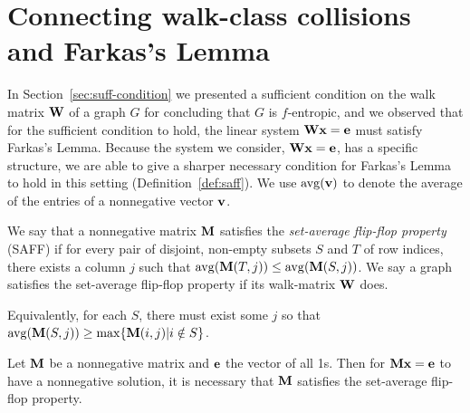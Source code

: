 
\section{Connecting walk-class collisions and Farkas's Lemma}
In Section~\ref{sec:suff-condition} we presented a sufficient condition on the walk matrix $\textbf{W}$ of a graph $G$ for concluding that $G$ is $f$-entropic, and we observed that for the sufficient condition to hold, the linear system $\textbf{W}\textbf{x} = \textbf{e}$ must satisfy Farkas's Lemma.
Because the system we consider, $\textbf{W}\textbf{x} = \textbf{e}$, has a specific structure, we are able to give a sharper necessary condition for Farkas's Lemma to hold in this setting (Definition~\ref{def:saff}).
We use $\operatorname*{avg}(\textbf{v})$ to denote the average of the entries of a nonnegative vector $\textbf{v}$.
\begin{definition}\label{def:saff}
    We say that a nonnegative matrix $\textbf{M}$ satisfies the \emph{set-average flip-flop property} (SAFF) if for every pair of disjoint, non-empty subsets $S$ and $T$ of row indices, there exists a column $j$ such that $\operatorname*{avg}(\textbf{M}(T,j)) \leq \operatorname*{avg}(\textbf{M}(S,j))$.
    We say a graph satisfies the set-average flip-flop property if its walk-matrix $\textbf{W}$ does.
\end{definition}
Equivalently, for each $S$, there must exist some $j$ so that $\operatorname*{avg}( \textbf{M}(S,j) ) \geq \max\{  \textbf{M}(i,j) | i \notin S \}$.
\begin{lemma}
  Let $\textbf{M}$ be a nonnegative matrix and $\textbf{e}$ the vector of all 1s.
  Then for $\textbf{M}\textbf{x} = \textbf{e}$ to have a nonnegative solution, it is necessary that
  $\textbf{M}$ satisfies the set-average flip-flop property.
\end{lemma}
